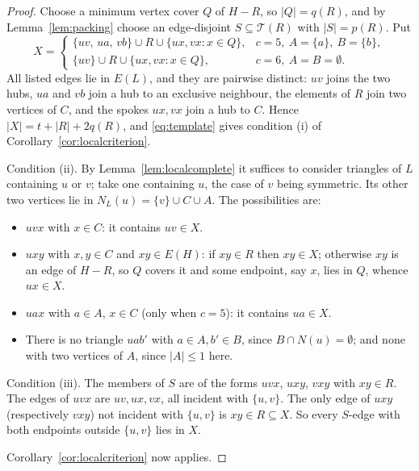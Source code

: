 \documentclass[10pt,a4paper]{amsart}
\newcommand{\N}{N}
\begin{document}
\begin{proof}
Choose a minimum vertex cover $Q$ of $H-R$, so $|Q|=q(R)$, and by
Lemma~\ref{lem:packing} choose an edge-disjoint $S\subseteq\mathcal{T}(R)$
with $|S|=p(R)$. Put
\[
  X=\begin{cases}
    \{uv,\,ua,\,vb\}\cup R\cup\{ux,vx : x\in Q\}, & c=5,\ A=\{a\},\ B=\{b\},\\[2pt]
    \{uv\}\cup R\cup\{ux,vx : x\in Q\}, & c=6,\ A=B=\emptyset.
  \end{cases}
\]
All listed edges lie in $E(L)$, and they are pairwise distinct: $uv$ joins the
two hubs, $ua$ and $vb$ join a hub to an exclusive neighbour, the elements of
$R$ join two vertices of $C$, and the spokes $ux,vx$ join a hub to $C$. Hence
$|X|=t+|R|+2q(R)$, and \eqref{eq:template} gives condition (i) of
Corollary~\ref{cor:localcriterion}.

Condition (ii). By Lemma~\ref{lem:localcomplete} it suffices to consider
triangles of $L$ containing $u$ or $v$; take one containing $u$, the case of
$v$ being symmetric. Its other two vertices lie in
$\N_L(u)=\{v\}\cup C\cup A$. The possibilities are:
\begin{itemize}
  \item $uvx$ with $x\in C$: it contains $uv\in X$.
  \item $uxy$ with $x,y\in C$ and $xy\in E(H)$: if $xy\in R$ then $xy\in X$;
    otherwise $xy$ is an edge of $H-R$, so $Q$ covers it and some endpoint,
    say $x$, lies in $Q$, whence $ux\in X$.
  \item $uax$ with $a\in A$, $x\in C$ (only when $c=5$): it contains
    $ua\in X$.
  \item There is no triangle $uab'$ with $a\in A,b'\in B$, since
    $B\cap \N(u)=\emptyset$; and none with two vertices of $A$, since
    $|A|\le1$ here.
\end{itemize}
Condition (iii). The members of $S$ are of the forms $uvx$, $uxy$, $vxy$ with
$xy\in R$. The edges of $uvx$ are $uv,ux,vx$, all incident with $\{u,v\}$. The
only edge of $uxy$ (respectively $vxy$) not incident with $\{u,v\}$ is
$xy\in R\subseteq X$. So every $S$-edge with both endpoints outside $\{u,v\}$
lies in $X$.

Corollary~\ref{cor:localcriterion} now applies.
\end{proof}
\end{document}
